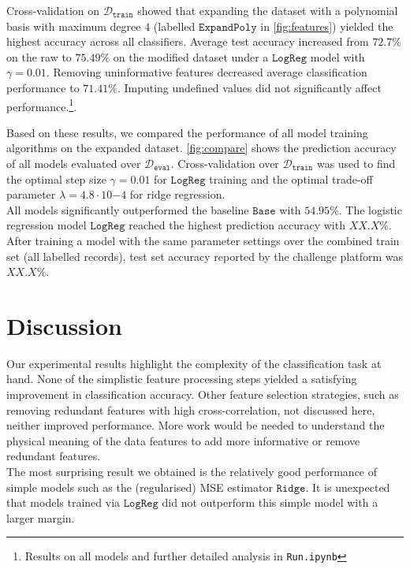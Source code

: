 \documentclass[10pt,conference,compsocconf]{IEEEtran}
\newcommand{\Deval}{\mathcal{D}_{\mathtt{eval}}}
\newcommand{\Dtrain}{\mathcal{D}_{\mathtt{train}}}
\newcommand{\Baseline}{\mathtt{Base}}
\newcommand{\Ridge}{\mathtt{Ridge}}
\newcommand{\LogReg}{\mathtt{LogReg}}
\begin{document}
Cross-validation on $\Dtrain$ showed that expanding the dataset with a polynomial basis with maximum degree $4$ (labelled $\mathtt{ExpandPoly}$ in \autoref{fig:features}) yielded the highest accuracy across all classifiers. Average test accuracy increased from $72.7\%$ on the raw to $75.49\%$ on the modified dataset under a $\LogReg$ model with $\gamma = 0.01$. Removing uninformative features decreased average classification performance to $71.41\%$. Imputing undefined values did not significantly affect performance.\footnote{Results on all models and further detailed analysis in \texttt{Run.ipynb}}.

Based on these results, we compared the performance of all model training algorithms on the expanded dataset. \autoref{fig:compare} shows the prediction accuracy of all models evaluated over $\Deval$. Cross-validation over $\Dtrain$ was used to find the optimal step size $\gamma=0.01$ for $\LogReg$ training and the optimal trade-off parameter $\lambda=4.8 \cdot 10{-4}$ for ridge regression.\\
All models significantly outperformed the baseline $\Baseline$ with $54.95\%$. The logistic regression model $\LogReg$ reached the highest prediction accuracy with $XX.X\%$. After training a model with the same parameter settings over the combined train set (all labelled records), test set accuracy reported by the challenge platform was $XX.X\%$. 

\vspace*{-2mm}
\section{Discussion}
Our experimental results highlight the complexity of the classification task at hand. None of the simplistic feature processing steps yielded a satisfying improvement in classification accuracy. Other feature selection strategies, such as removing redundant features with high cross-correlation, not discussed here, neither improved performance.
More work would be needed to understand the physical meaning of the data features to add more informative or remove redundant features.\\
The most surprising result we obtained is the relatively good performance of simple models such as the (regularised) MSE estimator $\Ridge$. It is unexpected that models trained via $\LogReg$ did not outperform this simple model with a larger margin.



\end{document}
